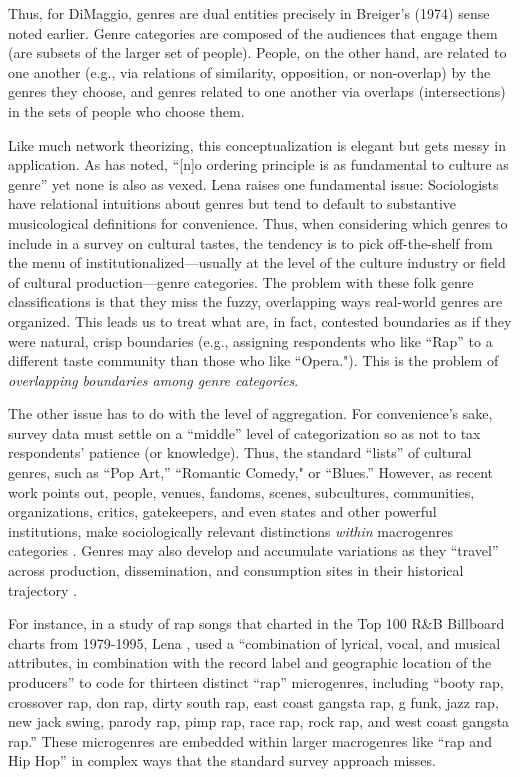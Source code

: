 \documentclass[a4paper,12pt]{article}
\begin{document}
Thus, for DiMaggio, genres are dual entities precisely in Breiger's (1974) sense noted earlier. Genre categories are composed of the audiences that engage them (are subsets of the larger set of people). People, on the other hand, are related to one another (e.g., via relations of similarity, opposition, or non-overlap) by the genres they choose, and genres related to one another via overlaps (intersections) in the sets of people who choose them.

Like much network theorizing, this conceptualization is elegant but gets messy in application. As \citet[149]{lena2015relational} has noted, ``[n]o ordering principle is as fundamental to culture as genre'' yet none is also as vexed. Lena raises one fundamental issue: Sociologists have relational intuitions about genres but tend to default to substantive musicological definitions for convenience. Thus, when considering which genres to include in a survey on cultural tastes, the tendency is to pick off-the-shelf from the menu of institutionalized---usually at the level of the culture industry or field of cultural production---genre categories. The problem with these folk genre classifications is that they miss the fuzzy, overlapping ways real-world genres are organized. This leads us to treat what are, in fact, contested boundaries as if they were natural, crisp boundaries (e.g., assigning respondents who like ``Rap'' to a different taste community than those who like ``Opera."). This is the problem of \textit{overlapping boundaries among genre categories}. 

The other issue has to do with the level of aggregation. For convenience’s sake, survey data must settle on a ``middle'' level of categorization so as not to tax respondents' patience (or knowledge). Thus, the standard ``lists'' of cultural genres, such as ``Pop Art,'' ``Romantic Comedy," or ``Blues.'' However, as recent work points out, people, venues, fandoms, scenes, subcultures, communities, organizations, critics, gatekeepers, and even states and other powerful institutions, make sociologically relevant distinctions \textit{within} macrogenres categories \citep{hesmondhalgh2005subcultures, Holt2007, Van_Poecke2018, Hield2014-xe}. Genres may also develop and accumulate variations as they ``travel'' across production, dissemination, and consumption sites in their historical trajectory \citep{Lena2012}. 

For instance, in a study of rap songs that charted in the Top 100 R\&B Billboard charts from 1979-1995, Lena \citeyearpar[299]{lena2004meaning}, used a ``combination of lyrical, vocal, and musical attributes, in combination with the record label and geographic location of the producers'' to code for thirteen distinct ``rap'' microgenres, including ``booty rap, crossover rap, don rap, dirty south rap, east coast gangsta rap, g funk, jazz rap, new jack swing, parody rap, pimp rap, race rap, rock rap, and west coast gangsta rap.'' These microgenres are embedded within larger macrogenres like ``rap and Hip Hop'' in complex ways that the standard survey approach misses.
\end{document}
